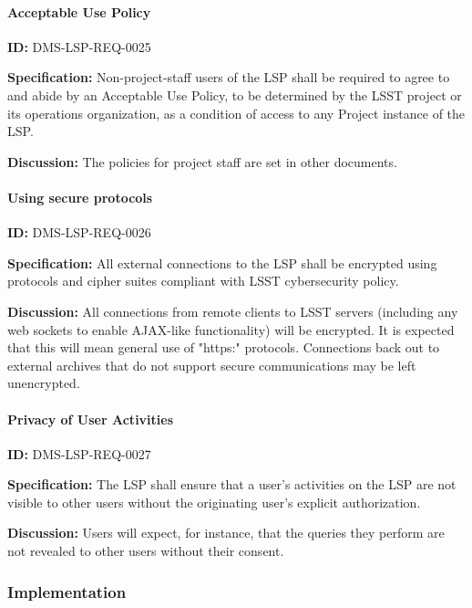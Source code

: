 \documentclass[SE,toc]{lsstdoc}
\begin{document}
\paragraph{Acceptable Use Policy}\hfill  %

\label{DMS-LSP-REQ-0025}
\textbf{ID:} DMS-LSP-REQ-0025

\textbf{Specification:}
Non-project-staff users of the LSP shall be required to agree to and abide by an Acceptable Use Policy, to be determined by the LSST project or its operations organization, as a condition of access to any Project instance of the LSP.

\textbf{Discussion:}
The policies for project staff are set in other documents.

\paragraph{Using secure protocols}\hfill  %

\label{DMS-LSP-REQ-0026}
\textbf{ID:} DMS-LSP-REQ-0026

\textbf{Specification:}
All external connections to the LSP shall be encrypted using protocols and cipher suites compliant with LSST cybersecurity policy.

\textbf{Discussion:}
All connections from remote clients to LSST servers (including any web sockets to enable AJAX-like functionality) will be encrypted. It is expected that this will mean general use of "https:" protocols.
Connections back out to external archives that do not support secure communications may be left unencrypted.

\paragraph{Privacy of User Activities}\hfill  %

\label{DMS-LSP-REQ-0027}
\textbf{ID:} DMS-LSP-REQ-0027

\textbf{Specification:}
The LSP shall ensure that a user's activities on the LSP are not visible to other users without the originating user's explicit authorization.

\textbf{Discussion:}
Users will expect, for instance, that the queries they perform are not revealed to other users without their consent.

\subsubsection{Implementation}
\end{document}
